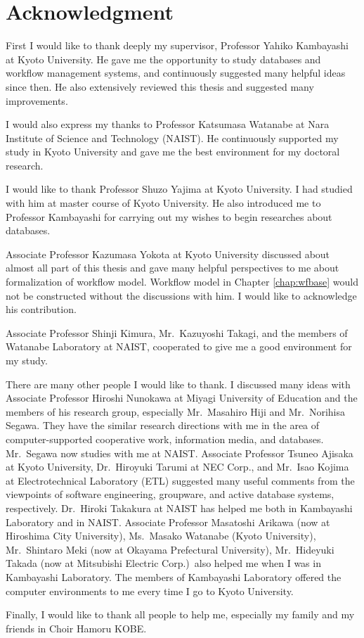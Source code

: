 
\chapter*{Acknowledgment}

First I would like to thank deeply my supervisor, Professor Yahiko
Kambayashi at Kyoto University.  He gave me the opportunity to study
databases and workflow management systems, and continuously suggested
many helpful ideas since then.  He also extensively reviewed this thesis
and suggested many improvements.

I would also express my thanks to Professor Katsumasa Watanabe at Nara
Institute of Science and Technology (NAIST)\@.  He continuously supported
my study in Kyoto University and gave me the best environment for my
doctoral research.

I would like to thank Professor Shuzo Yajima at Kyoto University.  I had
studied with him at master course of Kyoto University.  He also
introduced me to Professor Kambayashi for carrying out my wishes to
begin researches about databases.

Associate Professor Kazumasa Yokota at Kyoto University discussed about
almost all part of this thesis and gave many helpful perspectives to me
about formalization of workflow model.  Workflow model in Chapter
\ref{chap:wfbase} would not be constructed without the discussions with
him.  I would like to acknowledge his contribution.

Associate Professor Shinji Kimura, Mr.\ Kazuyoshi Takagi, and the members
of Watanabe Laboratory at NAIST, cooperated to give me a good
environment for my study.

There are many other people I would like to thank.  I discussed many
ideas with Associate Professor Hiroshi Nunokawa at Miyagi University of
Education and the members of his research group, especially Mr.\ Masahiro
Hiji and Mr.\ Norihisa Segawa.  They have the similar research directions
with me in the area of computer-supported cooperative work, information
media, and databases.  Mr.\ Segawa now studies with me at NAIST\@.
Associate Professor Tsuneo Ajisaka at Kyoto University, Dr.\ Hiroyuki
Tarumi at NEC Corp., and Mr.\ Isao Kojima at Electrotechnical Laboratory
(ETL) suggested many useful comments from the viewpoints of software
engineering, groupware, and active database systems, respectively.
Dr.\ Hiroki Takakura at NAIST has helped me both in Kambayashi Laboratory
and in NAIST\@.  Associate Professor Masatoshi Arikawa (now at Hiroshima
City University), Ms.\ Masako Watanabe (Kyoto University), Mr.\ Shintaro
Meki (now at Okayama Prefectural University), Mr.\ Hideyuki Takada (now
at Mitsubishi Electric Corp.)\ also helped me when I was in Kambayashi
Laboratory.  The members of Kambayashi Laboratory offered the computer
environments to me every time I go to Kyoto University.

Finally, I would like to thank all people to help me, especially my
family and my friends in Choir Hamoru KOBE.

